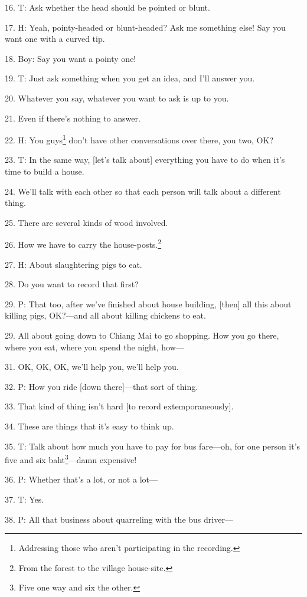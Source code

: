 16. T: \direct{[whispers} Ask whether the head should be pointed or
blunt.

17. H: Yeah, pointy-headed or blunt-headed? Ask me something else! Say you want
one with a curved tip.

18. Boy: Say you want a pointy one!

19. T: Just ask something when you get an idea, and I'll answer you.

20. Whatever you say, whatever you want to ask is up to you.

21. Even if there's nothing to answer.

22. H: You guys\footnote{Addressing those who aren't participating in the recording.} don't have other conversations over there, you two, OK?

23. T: In the same way, [let's talk about] everything you have to do when it's
time to build a house.

24. We'll talk with each other so that each person will talk about a different
thing.

25. There are several kinds of wood involved.

26. How we have to carry the house-posts.\footnote{From the forest to the village house-site.}

27. H: About slaughtering pigs to eat.

28. Do you want to record that first?

29. P: That too, after we've finished about house building, [then] all
this about killing pigs, OK?---and all about killing chickens to eat.

29. All about going down to Chiang Mai to go shopping. How you go there, where
you eat, where you spend the night, how---

31. OK, OK, OK, we'll help you, we'll help you.

32. P: How you ride [down there]---that sort of thing.

33. That kind of thing isn't hard [to record extemporaneously].

34. These are things that it's easy to think up.

35. T: Talk about how much you have to pay for bus fare---oh, for one person it's
five and six baht\footnote{Five one way and six the other.}---damn expensive!

36. P: Whether that's a lot, or not a lot---

37. T: Yes.

38. P: All that business about quarreling with the bus driver---

